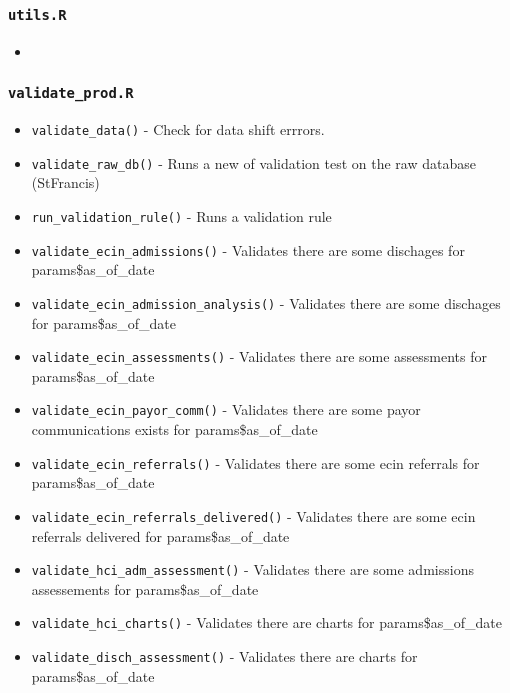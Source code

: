 \documentclass[
]{book}
\providecommand{\tightlist}{%
  \setlength{\itemsep}{0pt}\setlength{\parskip}{0pt}}
\begin{document}
\hypertarget{utils.r}{%
\subsubsection{\texorpdfstring{\texttt{utils.R}}{utils.R}}\label{utils.r}}

\begin{itemize}
\item
\end{itemize}

\hypertarget{validate_prod.r}{%
\subsubsection{\texorpdfstring{\texttt{validate\_prod.R}}{validate\_prod.R}}\label{validate_prod.r}}

\begin{itemize}
\tightlist
\item
  \texttt{validate\_data()} - Check for data shift errrors.
\item
  \texttt{validate\_raw\_db()} - Runs a new of validation test on the raw database (StFrancis)
\item
  \texttt{run\_validation\_rule()} - Runs a validation rule
\item
  \texttt{validate\_ecin\_admissions()} - Validates there are some dischages for params\$as\_of\_date
\item
  \texttt{validate\_ecin\_admission\_analysis()} - Validates there are some dischages for params\$as\_of\_date
\item
  \texttt{validate\_ecin\_assessments()} - Validates there are some assessments for params\$as\_of\_date
\item
  \texttt{validate\_ecin\_payor\_comm()} - Validates there are some payor communications exists for params\$as\_of\_date
\item
  \texttt{validate\_ecin\_referrals()} - Validates there are some ecin referrals for params\$as\_of\_date
\item
  \texttt{validate\_ecin\_referrals\_delivered()} - Validates there are some ecin referrals delivered for params\$as\_of\_date
\item
  \texttt{validate\_hci\_adm\_assessment()} - Validates there are some admissions assessements for params\$as\_of\_date
\item
  \texttt{validate\_hci\_charts()} - Validates there are charts for params\$as\_of\_date
\item
  \texttt{validate\_disch\_assessment()} - Validates there are charts for params\$as\_of\_date

\end{itemize}
\end{document}
